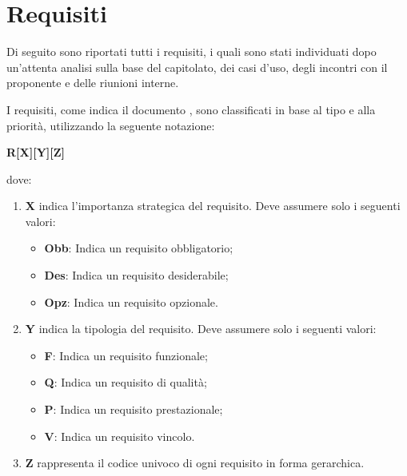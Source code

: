 \documentclass[../AnalisiDeiRequisiti.tex]{subfiles}
\begin{document}
\section{Requisiti}
	Di seguito sono riportati tutti i requisiti, i quali sono stati individuati dopo un'attenta analisi sulla base del capitolato, dei casi d’uso, degli incontri con il proponente e delle riunioni interne.

I requisiti, come indica il documento \normediprogettov , sono classificati in base al tipo e alla priorità, utilizzando la seguente notazione:
				\begin{center}\textbf{R[X][Y][Z]}\end{center} dove:
					\begin{enumerate}
						\item \textbf{X} indica l'importanza strategica del requisito. Deve assumere solo i seguenti valori:
						\begin{itemize}
							\item \textbf{Obb}: Indica un requisito obbligatorio;
							\item \textbf{Des}: Indica un requisito desiderabile;
							\item \textbf{Opz}: Indica un requisito opzionale.
						\end{itemize}
						\item \textbf{Y} indica la tipologia del requisito. Deve assumere solo i seguenti valori:
						\begin{itemize}
							\item \textbf{F}: Indica un requisito funzionale;
							\item \textbf{Q}: Indica un requisito di qualità;
							\item \textbf{P}: Indica un requisito prestazionale;
							\item \textbf{V}: Indica un requisito vincolo.
						\end{itemize}
						\item \textbf{Z} rappresenta il codice univoco di ogni requisito in forma gerarchica.
					\end{enumerate}
\end{document}
